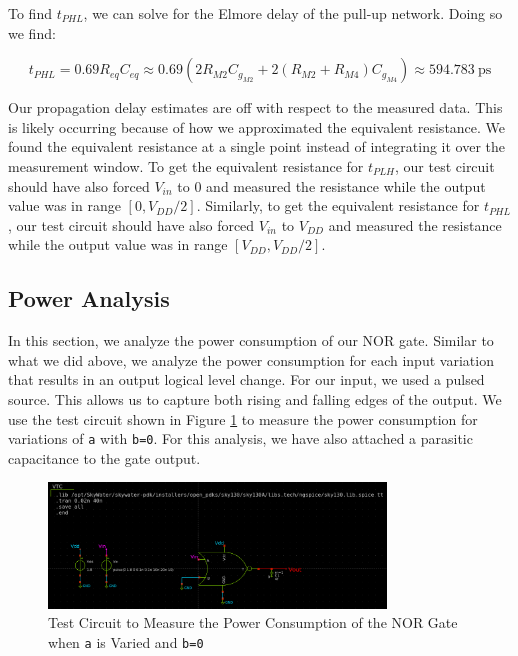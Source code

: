 \documentclass[fleqn]{article}
\begin{document}
	\noindent To find $t_{PHL}$, we can solve for the Elmore delay of the pull-up network. Doing so we find:
	
	\begin{equation}
		t_{PHL} = 0.69R_{eq}C_{eq} \approx 0.69(2R_{M2}C_{g_{M2}} + 2(R_{M2} + R_{M4})C_{g_{M4}})\approx 594.783\ \text{ps}
	\end{equation}
	
	Our propagation delay estimates are off with respect to the measured data. This is likely occurring because of how we approximated the equivalent resistance. We found the equivalent resistance at a single point instead of integrating it over the measurement window. To get the equivalent resistance for $t_{PLH}$, our test circuit should have also forced $V_{in}$ to $0$ and measured the resistance while the output value was in range $[0, V_{DD}/2]$. Similarly, to get the equivalent resistance for $t_{PHL}$, our test circuit should have also forced $V_{in}$ to $V_{DD}$ and measured the resistance while the output value was in range $[V_{DD}, V_{DD}/2]$.
	
	\subsection{Power Analysis}
	
	In this section, we analyze the power consumption of our NOR gate. Similar to what we did above, we analyze the power consumption for each input variation that results in an output logical level change. For our input, we used a pulsed source. This allows us to capture both rising and falling edges of the output. We use the test circuit shown in Figure \ref{fig::nor_power_test_sweep_va} to measure the power consumption for variations of \texttt{a} with \texttt{b=0}. For this analysis, we have also attached a parasitic capacitance to the gate output.
	
	\begin{figure}[H]
		\centerline{\includegraphics[width=0.8\textwidth]{nor_power_test_sweep_va.png}}
		\caption{Test Circuit to Measure the Power Consumption of the NOR Gate when \texttt{a} is Varied and \texttt{b=0}}
		\label{fig::nor_power_test_sweep_va}
	\end{figure}
	
\end{document}
